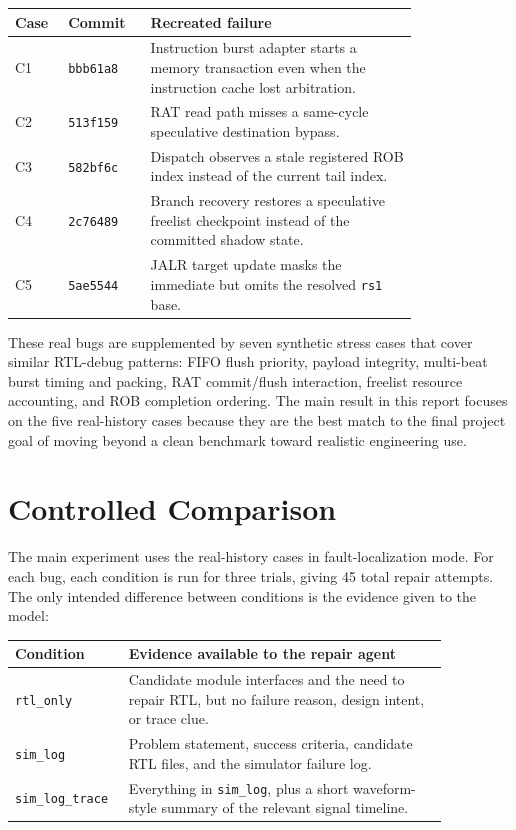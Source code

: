 \documentclass[11pt]{article}
\begin{document}
\begin{center}
\small
\begin{tabular}{p{0.08\linewidth}p{0.15\linewidth}p{0.57\linewidth}}
\toprule
Case & Commit & Recreated failure \\
\midrule
C1 & \texttt{bbb61a8} & Instruction burst adapter starts a memory transaction even when the instruction cache lost arbitration. \\
C2 & \texttt{513f159} & RAT read path misses a same-cycle speculative destination bypass. \\
C3 & \texttt{582bf6c} & Dispatch observes a stale registered ROB index instead of the current tail index. \\
C4 & \texttt{2c76489} & Branch recovery restores a speculative freelist checkpoint instead of the committed shadow state. \\
C5 & \texttt{5ae5544} & JALR target update masks the immediate but omits the resolved \texttt{rs1} base. \\
\bottomrule
\end{tabular}
\end{center}

These real bugs are supplemented by seven synthetic stress cases that cover
similar RTL-debug patterns: FIFO flush priority, payload integrity, multi-beat
burst timing and packing, RAT commit/flush interaction, freelist resource
accounting, and ROB completion ordering. The main result in this report focuses
on the five real-history cases because they are the best match to the final
project goal of moving beyond a clean benchmark toward realistic engineering
use.

\section*{Controlled Comparison}
The main experiment uses the real-history cases in fault-localization mode. For
each bug, each condition is run for three trials, giving 45 total repair
attempts. The only intended difference between conditions is the evidence given
to the model:

\begin{center}
\small
\begin{tabular}{p{0.18\linewidth}p{0.68\linewidth}}
\toprule
Condition & Evidence available to the repair agent \\
\midrule
\texttt{rtl\_only} & Candidate module interfaces and the need to repair RTL, but no failure reason, design intent, or trace clue. \\
\texttt{sim\_log} & Problem statement, success criteria, candidate RTL files, and the simulator failure log. \\
\texttt{sim\_log\_trace} & Everything in \texttt{sim\_log}, plus a short waveform-style summary of the relevant signal timeline. \\
\bottomrule
\end{tabular}
\end{center}
\end{document}
